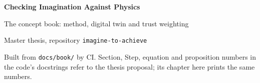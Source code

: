 \documentclass[11pt,a4paper,oneside]{book}
\begin{document}
\frontmatter
\hypersetup{pageanchor=false}
\begin{titlepage}
  \centering
  \vspace*{4cm}
  {\LARGE\bfseries\color{navy} Checking Imagination Against Physics\par}
  \vspace{0.8cm}
  {\large\color{navy} The concept book: method, digital twin and trust weighting\par}
  \vspace{1.5cm}
  {\normalsize Master thesis, repository \texttt{imagine-to-achieve}\par}
  \vfill
  {\small Built from \texttt{docs/book/} by CI. Section, Step, equation and proposition numbers
  in the code's docstrings refer to the thesis proposal; its chapter here prints the same numbers.\par}
\end{titlepage}
\hypersetup{pageanchor=true}
\tableofcontents

\mainmatter








\appendix


\backmatter

\end{document}
